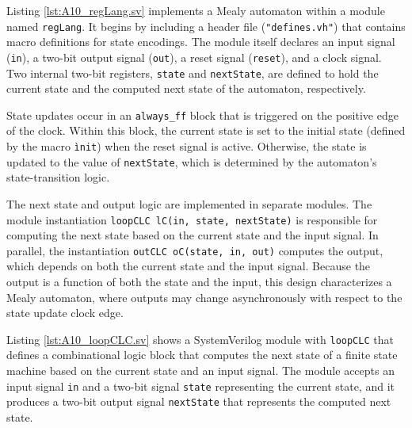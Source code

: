 \begin{exemplu}
{

Listing \ref{lst:A10_regLang.sv} implements a Mealy automaton within a module named \texttt{regLang}. It begins by including a header file (\texttt{"defines.vh"}) that contains macro definitions for state encodings. The module itself declares an input signal (\texttt{in}), a two-bit output signal (\texttt{out}), a reset signal (\texttt{reset}), and a clock signal. Two internal two-bit registers, \texttt{state} and \texttt{nextState}, are defined to hold the current state and the computed next state of the automaton, respectively.

State updates occur in an \texttt{always\_ff} block that is triggered on the positive edge of the clock. Within this block, the current state is set to the initial state (defined by the macro \texttt{\`init}) when the reset signal is active. Otherwise, the state is updated to the value of \texttt{nextState}, which is determined by the automaton’s state-transition logic.

The next state and output logic are implemented in separate modules. The module instantiation \texttt{loopCLC lC(in, state, nextState)} is responsible for computing the next state based on the current state and the input signal. In parallel, the instantiation \texttt{outCLC oC(state, in, out)} computes the output, which depends on both the current state and the input signal. Because the output is a function of both the state and the input, this design characterizes a Mealy automaton, where outputs may change asynchronously with respect to the state update clock edge.


Listing \ref{lst:A10_loopCLC.sv} shows a SystemVerilog module with \texttt{loopCLC} that defines a combinational logic block that computes the next state of a finite state machine based on the current state and an input signal. The module accepts an input signal \texttt{in} and a two-bit signal \texttt{state} representing the current state, and it produces a two-bit output signal \texttt{nextState} that represents the computed next state. 

}
\end{exemplu}
